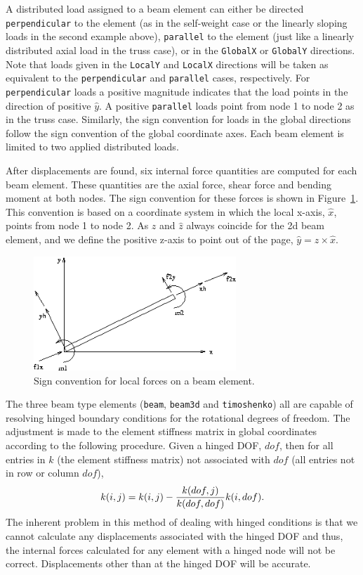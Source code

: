 A distributed load assigned to a beam element can either be directed 
{\tt perpendicular} to the element (as in the self-weight case or the linearly 
sloping loads in the second example above), {\tt parallel} to the element 
(just like a linearly distributed axial load in the truss case), or
in the {\tt GlobalX} or {\tt GlobalY} directions.  Note that loads given
in the {\tt LocalY} and {\tt LocalX} directions will be taken as equivalent to
the {\tt perpendicular} and {\tt parallel} cases, respectively.  
For {\tt perpendicular} loads a positive magnitude indicates that the load 
points in the direction of positive $\hat y$.
A  positive {\tt parallel} loads point from node 1 to node 2 as 
in the truss case. Similarly, the sign convention for loads in the global
directions follow the sign convention of the global coordinate axes.
Each beam element is limited to two applied distributed 
loads.

After displacements are found, six internal force quantities are computed for 
each beam element.  These quantities are the axial force, shear force and 
bending moment at both nodes.  The sign convention for these forces is
shown in Figure~\ref{elements.beam_fig}.  This convention is based on a
coordinate system in which the local x-axis, $\hat x$, points
from node 1 to node 2.  As $z$ and $\hat z$ always coincide for the 2d beam
element, and we define the positive z-axis to point out of the page,
$\hat y = z \times \hat x$. 

\begin{figure}
 \begin{center}
  \includegraphics[width=3.0in]{figures/beam}
 \end{center}
 \caption{Sign convention for local forces on a beam element.}
 \label{elements.beam_fig}
\end{figure} 

The three beam type elements ({\tt beam}, {\tt beam3d} and {\tt timoshenko})
all are capable of resolving hinged boundary
conditions for the rotational degrees of freedom.  The adjustment is made
to the element stiffness matrix in global coordinates according to the
following procedure.  Given a hinged DOF, $dof$, then for all entries in 
$k$ (the element stiffness matrix) not associated with $dof$ (all entries
not in row or column $dof$), 
\begin{equation}
k(i,j) = k(i,j) - {k(dof,j) \over k(dof,dof)}k(i,dof).
\end{equation}
The inherent problem in this method of dealing with hinged conditions is
that we cannot calculate any displacements associated with the hinged DOF
and thus, the internal forces calculated for any element with a hinged node 
will not be correct. Displacements other than at the hinged DOF will be
accurate.

